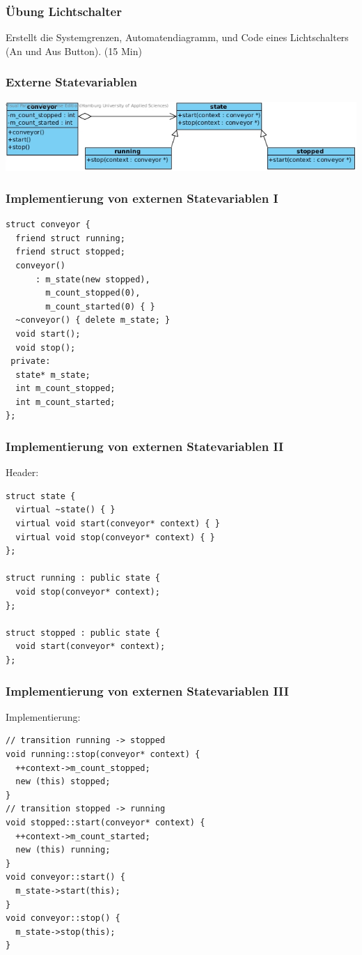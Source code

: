 \documentclass{beamer}
\begin{document}
\begin{frame}
 \frametitle{\"Ubung Lichtschalter}
 Erstellt die Systemgrenzen, Automatendiagramm, und Code eines Lichtschalters (An und Aus Button). (15 Min)
\end{frame}

\begin{frame}
 \frametitle{Externe Statevariablen}
  \includegraphics[scale=.44]{img/fsm_externe_state_var.jpg}
\end{frame}

\begin{frame}[fragile]
 \frametitle{Implementierung von externen Statevariablen I}
 \begin{lstlisting}
struct conveyor {
  friend struct running;
  friend struct stopped;
  conveyor()
      : m_state(new stopped),
        m_count_stopped(0),
        m_count_started(0) { }
  ~conveyor() { delete m_state; }
  void start();
  void stop();
 private:
  state* m_state;
  int m_count_stopped;
  int m_count_started;
};
\end{lstlisting}
\end{frame}

\begin{frame}[fragile]
  \frametitle{Implementierung von externen Statevariablen II}
  Header:
  \begin{lstlisting}
struct state {
  virtual ~state() { }
  virtual void start(conveyor* context) { }
  virtual void stop(conveyor* context) { }
};

struct running : public state {
  void stop(conveyor* context);
};

struct stopped : public state {
  void start(conveyor* context);
};
  \end{lstlisting}

\end{frame}


\begin{frame}[fragile]
  \frametitle{Implementierung von externen Statevariablen III}
  Implementierung:
  \begin{lstlisting}
// transition running -> stopped
void running::stop(conveyor* context) {
  ++context->m_count_stopped;
  new (this) stopped;
}
// transition stopped -> running
void stopped::start(conveyor* context) {
  ++context->m_count_started;
  new (this) running;
}
void conveyor::start() {
  m_state->start(this);
}
void conveyor::stop() {
  m_state->stop(this);
}
  \end{lstlisting}

\end{frame}
\end{document}
